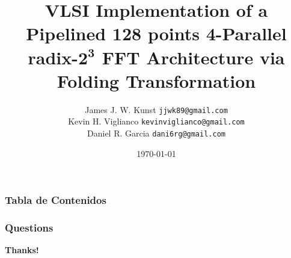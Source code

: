 \documentclass[xcolor=table,ps]{beamer}
\title[FFT Architecture via Folding Transformation]{\textbf{VLSI Implementation of a Pipelined 128 points 4-Parallel radix-$\mathbf{2^3}$ FFT Architecture via Folding Transformation}}
\author[]{
James J. W. Kunst  {\tt\small jjwk89@gmail.com}\\		
Kevin H. Viglianco	{\tt\small kevinviglianco@gmail.com}\\	 
Daniel R. Garcia	{\tt\small dani6rg@gmail.com}
}
\date{\today} %
\begin{document}
\begin{frame}
  \titlepage
\end{frame}



\begin{frame} 
  \frametitle{\textbf{Tabla de Contenidos}}
  \tableofcontents
\end{frame}






%
%  
%  


\begin{frame}
  \frametitle{\textbf{Questions}}
   \begin{center}
     {\Huge \textbf{Thanks!}\\}
    \end{center}
\end{frame}
\end{document}
